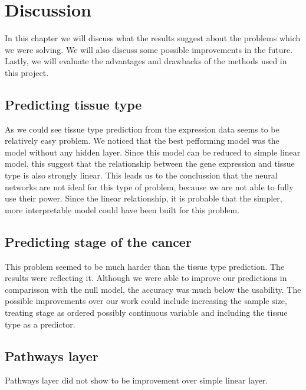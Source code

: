 \chapter{Discussion}
In this chapter we will discuss what the results suggest about the problems which we were solving.
We will also discuss some possible improvements in the future.
Lastly, we will evaluate the advantages and drawbacks of the methods used in this project.

\section{Predicting tissue type}
As we could see tissue type prediction from the expression data seems to be relatively easy problem.
We noticed that the best pefforming model was the model without any hidden layer.
Since this model can be reduced to simple linear model, this suggest that the relationship between the gene expression and tissue type is also strongly linear.
This leads us to the conclussion that the neural networks are not ideal for this type of problem, because we are not able to fully use their power.
Since the linear relationship, it is probable that the simpler, more interpretable model could have been built for this problem.

\section{Predicting stage of the cancer}
This problem seemed to be much harder than the tissue type prediction.
The results were reflecting it.
Although we were able to improve our predictions in comparisson with the null model, the accuracy was much below the usability.
The possible improvements over our work could include increasing the sample size, treating stage as ordered possibly continuous variable and including the tissue type as a predictor. 

\section{Pathways layer}
Pathways layer did not show to be improvement over simple linear layer.
